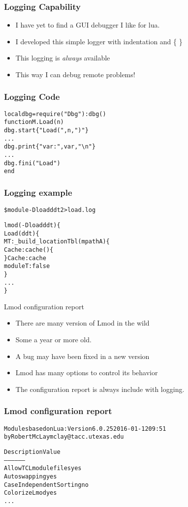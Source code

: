 \documentclass{beamer}
\begin{document}
\begin{frame}[fragile]
    \frametitle{Logging Capability}
  \begin{itemize}
    \item I have yet to find a GUI debugger I like for lua.
    \item I developed this simple logger with indentation and \{ \}
    \item This logging is \emph{\color{blue} always} available
    \item This way I can debug remote problems!
 \end{itemize}
\end{frame}    

\begin{frame}[fragile]
    \frametitle{Logging Code}
    {\small
      \begin{alltt}
local dbg = require("Dbg"):dbg()
function M.Load(n)
    dbg.start\{"Load(",n,")"\}
    ...
    dbg.print\{"var: ",var,"\textbackslash{}n"\}
    ...
    dbg.fini("Load")
end

      \end{alltt}
    }
\end{frame}    

\begin{frame}[fragile]
    \frametitle{Logging example}
    {\small
      \begin{alltt}
\$ module -D load ddt 2> load.log

lmod(-D load ddt)\{
  Load(ddt)\{
    MT:_build_locationTbl(mpathA)\{
      Cache:cache()\{
      \} Cache:cache
      moduleT: false
    \}
      ...
\}
      \end{alltt}
    }
\end{frame}    

\begin{frame}{Lmod configuration report}
  \begin{itemize}
    \item There are many version of Lmod in the wild
    \item Some a year or more old.
    \item A bug may have been fixed in a new version
    \item Lmod has many options to control its behavior
    \item The configuration report is always include with logging.
  \end{itemize}
\end{frame}

\begin{frame}[fragile]
    \frametitle{Lmod configuration report}
    {\small
      \begin{alltt}
Modules based on Lua: Version 6.0.25 2016-01-12 09:51
    by Robert McLay mclay@tacc.utexas.edu

Description                      Value
-----------                      -----
Allow TCL modulefiles            yes
Auto swapping                    yes
Case Independent Sorting         no
Colorize Lmod                    yes
...
      \end{alltt}
    }
\end{frame}    
\end{document}

